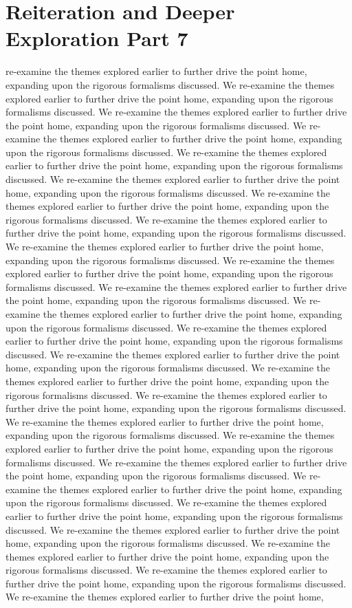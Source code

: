 \section{Reiteration and Deeper Exploration Part 7}\nWe re-examine the themes explored earlier to further drive the point home, expanding upon the rigorous formalisms discussed. We re-examine the themes explored earlier to further drive the point home, expanding upon the rigorous formalisms discussed. We re-examine the themes explored earlier to further drive the point home, expanding upon the rigorous formalisms discussed. We re-examine the themes explored earlier to further drive the point home, expanding upon the rigorous formalisms discussed. We re-examine the themes explored earlier to further drive the point home, expanding upon the rigorous formalisms discussed. We re-examine the themes explored earlier to further drive the point home, expanding upon the rigorous formalisms discussed. We re-examine the themes explored earlier to further drive the point home, expanding upon the rigorous formalisms discussed. We re-examine the themes explored earlier to further drive the point home, expanding upon the rigorous formalisms discussed. We re-examine the themes explored earlier to further drive the point home, expanding upon the rigorous formalisms discussed. We re-examine the themes explored earlier to further drive the point home, expanding upon the rigorous formalisms discussed. We re-examine the themes explored earlier to further drive the point home, expanding upon the rigorous formalisms discussed. We re-examine the themes explored earlier to further drive the point home, expanding upon the rigorous formalisms discussed. We re-examine the themes explored earlier to further drive the point home, expanding upon the rigorous formalisms discussed. We re-examine the themes explored earlier to further drive the point home, expanding upon the rigorous formalisms discussed. We re-examine the themes explored earlier to further drive the point home, expanding upon the rigorous formalisms discussed. We re-examine the themes explored earlier to further drive the point home, expanding upon the rigorous formalisms discussed. We re-examine the themes explored earlier to further drive the point home, expanding upon the rigorous formalisms discussed. We re-examine the themes explored earlier to further drive the point home, expanding upon the rigorous formalisms discussed. We re-examine the themes explored earlier to further drive the point home, expanding upon the rigorous formalisms discussed. We re-examine the themes explored earlier to further drive the point home, expanding upon the rigorous formalisms discussed. We re-examine the themes explored earlier to further drive the point home, expanding upon the rigorous formalisms discussed. We re-examine the themes explored earlier to further drive the point home, expanding upon the rigorous formalisms discussed. We re-examine the themes explored earlier to further drive the point home, expanding upon the rigorous formalisms discussed. We re-examine the themes explored earlier to further drive the point home, expanding upon the rigorous formalisms discussed. We re-examine the themes explored earlier to further drive the point home, 